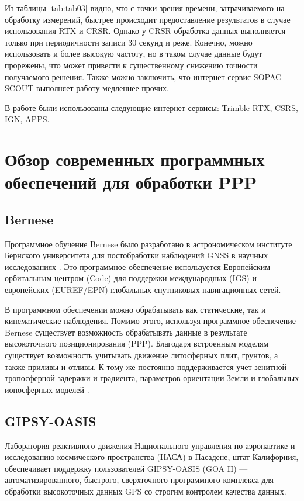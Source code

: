 Из таблицы \cref{tab:tab03} видно, что с точки зрения времени, затрачиваемого на обработку измерений, быстрее происходит предоставление результатов в случае использования RTX и CRSR. Однако у CRSR обработка данных выполняется только при периодичности записи 30 секунд и реже. Конечно, можно использовать и более высокую частоту, но в таком случае данные будут прорежены, что может привести к существенному снижению точности получаемого решения. Также можно заключить, что интернет-сервис SOPAC SCOUT выполняет работу медленнее прочих.

В работе были использованы следующие интернет-сервисы: Trimble RTX, CSRS, IGN, APPS.



\section{Обзор современных программных обеспечений для обработки PPP}\label{sec:ch2/sec2}

\subsection{Bernese} \label{subsec:ch2/sec2/sub1}

Программное обучение Bernese было разработано в астрономическом институте Бернского университета для постобработки наблюдений GNSS в научных исследованиях \cite{src47}. Это программное обеспечение используется Европейским орбитальным центром (Code) для поддержки международных (IGS) и европейских (EUREF/EPN) глобальных спутниковых навигационных сетей. 

В программном обеспечении можно обрабатывать как статические, так и кинематические наблюдения. Помимо этого, используя программное обеспечение Bernese существует возможность обрабатывать данные в результате высокоточного позиционирования (PPP). Благодаря встроенным моделям существует возможность учитывать движение литосферных плит, грунтов, а также приливы и отливы. К тому же постоянно поддерживается учет зенитной тропосферной задержки и градиента, параметров ориентации Земли и глобальных ионосферных моделей \cite{src51,src52}.

\subsection{GIPSY-OASIS} \label{subsec:ch2/sec2/sub2}

Лаборатория реактивного движения Национального управления по аэронавтике и исследованию космического пространства (НАСА) в Пасадене, штат Калифорния, обеспечивает поддержку пользователей GIPSY-OASIS (GOA II) --- автоматизированного, быстрого, сверхточного программного комплекса для обработки высокоточных данных GPS со строгим контролем качества данных.

